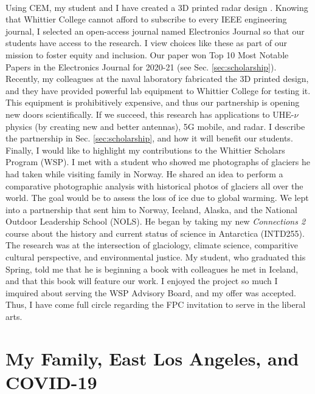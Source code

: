 \documentclass[../../main.tex]{subfiles}
\begin{document}
\\
\vspace{0.15cm}
Using CEM, my student and I have created a 3D printed radar design \cite{10.1016/j.cpc.2009.11.008}.  Knowing that Whittier College cannot afford to subscribe to every IEEE engineering journal, I selected an open-access journal named Electronics Journal so that our students have access to the research.  I view choices like these as part of our mission to foster equity and inclusion.  Our paper won Top 10 Most Notable Papers in the Electronics Journal for 2020-21 (see Sec. \ref{sec:scholarship}).  Recently, my colleagues at the naval laboratory fabricated the 3D printed design, and they have provided powerful lab equipment to Whittier College for testing it.  This equipment is prohibitively expensive, and thus our partnership is opening new doors scientifically.  If we succeed, this research has applications to UHE-$\nu$ physics (by creating new and better antennas), 5G mobile, and radar.  I describe the partnership in Sec. \ref{sec:scholarship}, and how it will benefit our students.
\\
\vspace{0.15cm}
Finally, I would like to highlight my contributions to the Whittier Scholars Program (WSP).  I met with a student who showed me photographs of glaciers he had taken while visiting family in Norway.  He shared an idea to perform a comparative photographic analysis with historical photos of glaciers all over the world.  The goal would be to assess the loss of ice due to global warming.  We lept into a partnership that sent him to Norway, Iceland, Alaska, and the National Outdoor Leadership School (NOLS).  He began by taking my new \textit{Connections 2} course about the history and current status of science in Antarctica (INTD255).  The research was at the intersection of glaciology, climate science, comparitive cultural perspective, and environmental justice.  My student, who graduated this Spring, told me that he is beginning a book with colleagues he met in Iceland, and that this book will feature our work.  I enjoyed the project so much I imquired about serving the WSP Advisory Board, and my offer was accepted.  Thus, I have come full circle regarding the FPC invitation to serve in the liberal arts.

\section{My Family, East Los Angeles, and COVID-19}
\label{sec:family}
\end{document}

